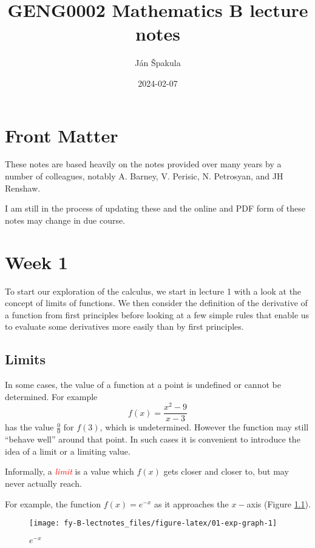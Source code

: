 \documentclass[
  11pt,
  oneside]{book}
\title{GENG0002 Mathematics B lecture notes}
\author{Ján Špakula}
\date{2024-02-07}
\newcommand{\slide}{}
\theoremstyle{definition}
\theoremstyle{definition}
\theoremstyle{definition}
\theoremstyle{definition}
\theoremstyle{remark}
\begin{document}
\maketitle

{
\setcounter{tocdepth}{1}
\tableofcontents
}
\chapter*{Front Matter}\label{front-matter}

These notes are based heavily on the notes provided over many years by a number of colleagues, notably A. Barney, V. Perisic, N. Petrosyan, and JH Renshaw.

I am still in the process of updating these and the online and PDF form of these notes may change in due course.

\chapter{Week 1}\label{week-one}

To start our exploration of the calculus, we start in lecture 1 with a look at the concept of limits of functions. We then consider the definition of the derivative of a function from first principles before looking at a few simple rules that enable us to evaluate some derivatives more easily than by first principles.
\slide

\section{Limits}\label{lecture-one}

In some cases, the value of a function at a point is undefined or cannot be determined. For example
\[
f(x) = \frac{x^2-9}{x-3}\tag{1}
\]
has the value \(\frac00\) for \(f(3)\), which is undetermined. However the function may still ``behave well'' around that point. In such cases it is convenient to introduce the idea of a limit or a limiting value.

Informally, a \textcolor{red}{\em limit} is a value which \(f(x)\) gets closer and closer to, but may never actually reach.

\slide

For example, the function \(f(x) = e^{-x}\) as it approaches the \(x-\)axis (Figure \ref{fig:01-exp-graph}).

\begin{figure}

{\centering \texttt{[image: fy-B-lectnotes\_files/figure-latex/01-exp-graph-1]} 

}

\caption{$e^{-x}$}\label{fig:01-exp-graph}
\end{figure}
\end{document}
